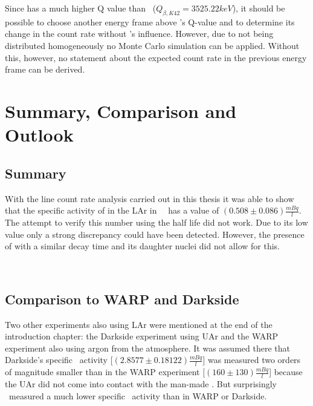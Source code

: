 \documentclass[encoding=utf8,british]{tumphthesis}
\begin{document}
Since  has a much higher Q value than \Kr\ ($Q_{\beta,K42} = 3525.22 \unit{keV}$), it should be possible to choose another energy frame above \Kr's Q-value and to determine its change in the count rate without \Kr's influence.
However, due to  not being distributed homogeneously no Monte Carlo simulation can be applied.
Without this, however, no statement about the expected count rate in the previous energy frame can be derived.












\chapter{Summary, Comparison and Outlook}
\label{sec:ConcAndOutlook}
\section{Summary}
With the line count rate analysis carried out in this thesis it was able to show that the specific activity of  in the LAr in \gerda\ \PII\ has a value of $(0.508\pm0.086) \frac{\unit{mBq}}{\unit{l}}$. 
The attempt to verify this number using the half life did not work.
Due to its low value only a strong discrepancy could have been detected.
However, the presence of  with a similar decay time and its daughter nuclei  did not allow for this.

\\
\section{Comparison to WARP and Darkside}

Two other experiments also using LAr were mentioned at the end of the introduction chapter: the Darkside experiment using UAr and the WARP experiment also using argon from the atmosphere.
It was assumed there that Darkside's specific \Kr\ activity [$(2.8577 \pm 0.18122) \frac{\unit{mBq}}{\unit{l}}$] was measured two orders of magnitude smaller than in the WARP experiment [$(160\pm130)\frac{\unit{mBq}}{\unit{l}}$] because the UAr did not come into contact with the man-made \Kr.
But surprisingly \gerda\ measured a much lower specific \Kr\ activity than in WARP or Darkside.
\\
\end{document}
